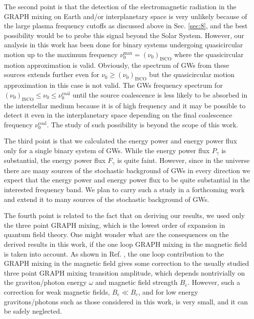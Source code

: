 \documentclass[a4paper,11pt]{article}
\begin{document}
The second point is that the detection of the electromagnetic radiation in the GRAPH mixing on Earth and/or interplanetary space is very unlikely because of the large plasma frequency cutoffs as discussed above in Sec. \ref{sec:8}, and the best possibility would be to probe this signal beyond the Solar System. However, our analysis in this work has been done for binary systems undergoing quasicircular motion up to the maximum frequency $\nu_0^\text{max}=(\nu_0)_\text{ISCO}$ where the quasicircular motion approximation is valid. Obviously, the spectrum of GWs from these sources extends further even for $\nu_0\geq (\nu_0)_\text{ISCO}$ but the quasicircular motion approximation in this case is not valid. The GWs frequency spectrum for $(\nu_0)_\text{ISCO}\leq \nu_0\leq \nu_0^\text{coal}$ until the source coalescence is less likely to be absorbed in the interstellar medium because it is of high frequency and it may be possible to detect it even in the interplanetary space depending on the final coalescence frequency $\nu_0^\text{coal}$. The study of such possibility is beyond the scope of this work.



The third point is that we calculated the energy power and energy power flux only for a single binary system of GWs. While the energy power flux $P_\gamma$ is substantial, the energy power flux $F_\gamma$ is quite faint. However, since in the universe there are many sources of the stochastic background of GWs in every direction we expect that the energy power and energy power flux to be quite substantial in the interested frequency band. We plan to carry such a study in a forthcoming work and extend it to many sources of the stochastic background of GWs.

The fourth point is related to the fact that on deriving our results, we used only the three point GRAPH mixing, which is the lowest order of expansion in quantum field theory. One might wonder what are the consequences on the derived results in this work, if the one loop GRAPH mixing in the magnetic field is taken into account. As shown in Ref. \cite{Bastianelli05}, the one loop contribution to the GRAPH mixing in the magnetic field gives some correction to the usually studied three point GRAPH mixing transition amplitude, which depends nontrivially on the graviton/photon energy $\omega$ and magnetic field strength $B_e$. However, such a correction for weak magnetic fields, $B_e\ll B_c$, and for low energy gravitons/photons such as those considered in this work, is very small, and it can be safely neglected.
\end{document}
